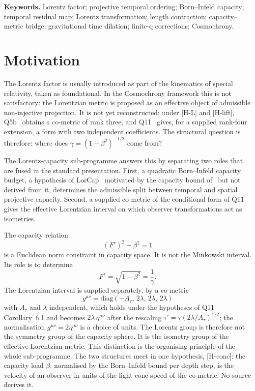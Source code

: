 \documentclass[12pt,a4paper]{article}
\theoremstyle{remark}
\begin{document}
  \medskip
  \noindent\textbf{Keywords.}
  Lorentz factor; projective temporal ordering; Born--Infeld capacity; temporal residual map;
  Lorentz transformation; length contraction; capacity--metric bridge; gravitational time
  dilation; finite-q corrections; Cosmochrony.

  \tableofcontents

  \newpage
  \section{Motivation}
    \label{sec:motivation}

    The Lorentz factor is usually introduced as part of the kinematics of special relativity,
    taken as foundational.
    In the Cosmochrony framework this is not satisfactory: the Lorentzian metric is proposed as an
    effective object of admissible non-injective projection.
    It is not yet reconstructed: under [H-L] and [H-lift], Q5b~\cite{Beau2026q5b} obtains a co-metric of rank three,
    and Q11~\cite{Beau2026q11} gives, for a supplied rank-four extension, a form with two independent
    coefficients.
    The structural question is therefore: where does $\gamma = (1-\beta^2)^{-1/2}$ come from?

    The Lorentz-capacity sub-programme answers this by separating two roles that are fused in
    the standard presentation.
    First, a quadratic Born--Infeld capacity budget, a hypothesis of LorCap~\cite{Beau2026n} motivated by the capacity
    bound of~\cite{Beau2026c} but not derived from it, determines the admissible split between temporal and spatial projective capacity.
    Second, a supplied co-metric of the conditional form of Q11 gives the effective Lorentzian interval on which
    observer transformations act as isometries.

    The capacity relation
    \[
      (F^\tau)^2 + \beta^2 = 1
    \]
    is a Euclidean norm constraint in capacity space.
    It is not the Minkowski interval.
    Its role is to determine
    \[
      F^\tau = \sqrt{1-\beta^2} = \frac{1}{\gamma}.
    \]
    The Lorentzian interval is supplied separately, by a co-metric
    \[
      g^{\mu\nu} = \mathrm{diag}(-A_\tau,\, 2\lambda,\, 2\lambda,\, 2\lambda)
    \]
    with $A_\tau$ and $\lambda$ independent, which holds under the hypotheses of Q11 Corollary~6.1 and becomes
    $2\lambda\,\eta^{\mu\nu}$ after the rescaling $\tau' = \tau(2\lambda/A_\tau)^{1/2}$; the normalisation
    $g^{\mu\nu} = 2\eta^{\mu\nu}$ is a choice of units.
    The Lorentz group is therefore not the symmetry group of the capacity sphere.
    It is the isometry group of the effective Lorentzian metric.
    This distinction is the organising principle of the whole sub-programme.
    The two structures meet in one hypothesis, [H-cone]: the capacity load $\beta$, normalised by the Born--Infeld
    bound per depth step, is the velocity of an observer in units of the light-cone speed of the co-metric.
    No source derives it.
\end{document}
